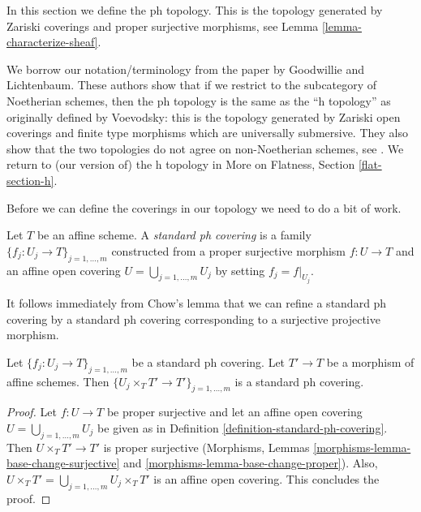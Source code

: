 \noindent
In this section we define the ph topology. This is the topology
generated by Zariski coverings and proper surjective morphisms, see
Lemma \ref{lemma-characterize-sheaf}.

\medskip\noindent
We borrow our notation/terminology
from the paper \cite{ph} by Goodwillie and Lichtenbaum.
These authors show that if we restrict to the subcategory of
Noetherian schemes, then the ph topology is the same as the
``h topology'' as originally defined by Voevodsky: this is
the topology generated by Zariski open coverings and
finite type morphisms which are universally submersive.
They also show that the two topologies do not agree on
non-Noetherian schemes, see \cite[Example 4.5]{ph}.
We return to (our version of) the h topology in
More on Flatness, Section \ref{flat-section-h}.

\medskip\noindent
Before we can define the coverings in our topology we need to do
a bit of work.

\begin{definition}
\label{definition-standard-ph-covering}
Let $T$ be an affine scheme. A {\it standard ph covering} is a family
$\{f_j : U_j \to T\}_{j = 1, \ldots, m}$ constructed from a
proper surjective morphism $f : U \to T$ and an affine open covering
$U = \bigcup_{j = 1, \ldots, m} U_j$ by setting $f_j = f|_{U_j}$.
\end{definition}

\noindent
It follows immediately from Chow's lemma that we can refine a
standard ph covering by a standard ph covering corresponding to
a surjective projective morphism.

\begin{lemma}
\label{lemma-base-change-standard-ph}
Let $\{f_j : U_j \to T\}_{j = 1, \ldots, m}$ be a standard ph covering.
Let $T' \to T$ be a morphism of affine schemes.
Then $\{U_j \times_T T' \to T'\}_{j = 1, \ldots, m}$ is a
standard ph covering.
\end{lemma}

\begin{proof}
Let $f : U \to T$ be proper surjective and let an affine open covering
$U = \bigcup_{j = 1, \ldots, m} U_j$ be given as in
Definition \ref{definition-standard-ph-covering}.
Then $U \times_T T' \to T'$ is proper surjective
(Morphisms, Lemmas \ref{morphisms-lemma-base-change-surjective} and
\ref{morphisms-lemma-base-change-proper}).
Also, $U \times_T T' = \bigcup_{j = 1, \ldots, m} U_j \times_T T'$
is an affine open covering.
This concludes the proof.
\end{proof}

